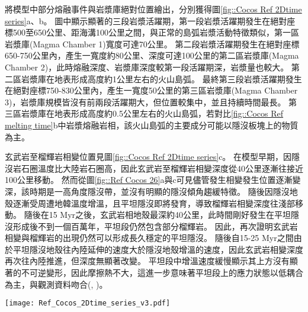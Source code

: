 將模型中部分熔融事件與岩漿庫絕對位置繪出，分別獲得圖\ref{fig::Cocos Ref 2Dtime series}a、b。
圖中顯示顯著的三段岩漿活躍期，第一段岩漿活躍期發生在絕對座標500至650公里、距海溝100公里之間，與正常的島弧岩漿活動特徵類似，第一區岩漿庫(Magma Chamber 1)寬度可達70公里。
第二段岩漿活躍期發生在絕對座標650-750公里內，產生一寬度約80公里、深度可達100公里的第二區岩漿庫(Magma Chamber 2)，此時熔融深度、岩漿庫深度較第一段活躍期深，岩漿量也較大。
第二區岩漿庫在地表形成高度約1公里左右的火山島弧。
最終第三段岩漿活躍期發生在絕對座標750-830公里內，產生一寬度50公里的第三區岩漿庫(Magma Chamber 3)，岩漿庫規模皆沒有前兩段活躍期大，但位置較集中，並且持續時間最長。
第三區岩漿庫在地表形成高度約0.5公里左右的火山島弧，若對比\ref{fig::Cocos Ref melting time}b中岩漿熔融岩相，該火山島弧的主要成分可能以隱沒板塊上的物質為主。

玄武岩至榴輝岩相變位置見圖\ref{fig::Cocos Ref 2Dtime series}c。
在模型早期，因隱沒岩石圈溫度比大陸岩石圈高，因此玄武岩至榴輝岩相變深度從40公里逐漸往接近100公里移動。
然而從圖\ref{fig::Ref Cocos 26}a與c可見儘管發生相變發生位置逐漸變深，該時期是一高角度隱沒帶，並沒有明顯的隱沒傾角趨緩特徵。
隨後因隱沒地殼逐漸受周遭地韓溫度增溫，且平坦隱沒即將發育，導致榴輝岩相變深度往淺部移動。
隨後在15 Myr之後，玄武岩相地殼最深約40公里，此時間剛好發生在平坦隱沒形成後不到一個百萬年，平坦段仍然包含部分榴輝岩。
因此，再次證明玄武岩相變與榴輝岩的出現仍然可以形成長久穩定的平坦隱沒。
隨後自15-25 Myr之間由於平坦隱沒地殼往內陸延伸的速度大於隱沒地殼增溫的速度，因此玄武岩相變深度再次往內陸推進，但深度無顯著改變。
平坦段中增溫速度緩慢顯示其上方沒有顯著的不可逆變形，因此摩擦熱不大，這進一步意味著平坦段上的應力狀態以低耦合為主，與觀測資料吻合(\citealp{moran2007cenozoic}, \citealp{PerezCampos2008})。

\begin{figure*}[ht]
    \centering
    \texttt{[image: Ref\_Cocos\_2Dtime\_series\_v3.pdf]}
    \caption[墨西哥參考模型部分熔融、岩漿庫與玄武岩相變時空關係圖]{墨西哥參考模型部分熔融、岩漿庫與玄武岩相變位置時空關係圖。(a)圓點為墨西哥參考模型於時間軸上部分熔融發生位置，圓點顏色代表時間，僅包含網格中熔融比例大於千分之一的網格。線條為每10 Myr的隱沒板塊頂部介面，分別為10 Myr、20Myr、30 Myr與40 Myr，橫軸上方標示出模型於40 Myr的相對海溝距離。(b)圓點為墨西哥參考模型於時間軸上岩漿庫發生位置，圓點顏色代表時間，僅繪出網格中岩漿比例大於千分之一的網格。線條為每10 Myr的隱沒板塊頂部介面，分別為10 Myr、20Myr、30 Myr與40 Myr，橫軸上方標示出模型於40 Myr的相對海溝距離。粉紅細線標示出三個岩漿庫，並分別在橘色方框中標出文中說明的岩漿庫名稱。(c)圓點為墨西哥參考模型於時間軸上之玄武岩相變位置變化圖，圓點顏色代表時間。}
    \label{fig::Cocos Ref 2Dtime series}
\end{figure*}

